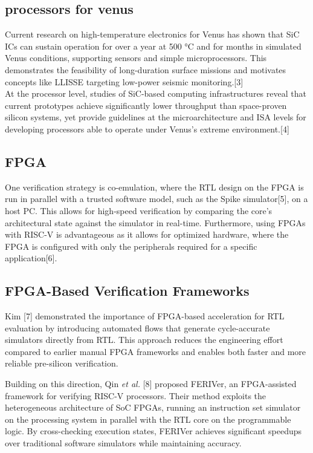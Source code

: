 \documentclass[10pt,twocolumn]{article}
\begin{document}
\subsection{processors for venus}
Current research on high-temperature electronics for Venus has shown that SiC ICs can sustain operation for over a year at 500 °C and for months in simulated Venus conditions, supporting sensors and simple microprocessors. This demonstrates the feasibility of long-duration surface missions and motivates concepts like LLISSE targeting low-power seismic monitoring.[3] \\
At the processor level, studies of SiC-based computing infrastructures reveal that current prototypes achieve significantly lower throughput than space-proven silicon systems, yet provide guidelines at the microarchitecture and ISA levels for developing processors able to operate under Venus’s extreme environment.[4]\\
\subsection{FPGA}
One verification strategy is co-emulation, where the RTL design on the FPGA is run in parallel with a trusted software model, such as the Spike simulator[5], on a host PC. This allows for high-speed verification by comparing the core's architectural state against the simulator in real-time. Furthermore, using FPGAs with RISC-V is advantageous as it allows for optimized hardware, where the FPGA is configured with only the peripherals required for a specific application[6].

\subsection{FPGA-Based Verification Frameworks}

Kim [7] demonstrated the importance of FPGA-based acceleration for RTL evaluation by introducing automated flows that generate cycle-accurate simulators directly from RTL. This approach reduces the engineering effort compared to earlier manual FPGA frameworks and enables both faster and more reliable pre-silicon verification. 

Building on this direction, Qin \textit{et al.} [8] proposed FERIVer, an FPGA-assisted framework for verifying RISC-V processors. Their method exploits the heterogeneous architecture of SoC FPGAs, running an instruction set simulator on the processing system in parallel with the RTL core on the programmable logic. By cross-checking execution states, FERIVer achieves significant speedups over traditional software simulators while maintaining accuracy. 
\end{document}
